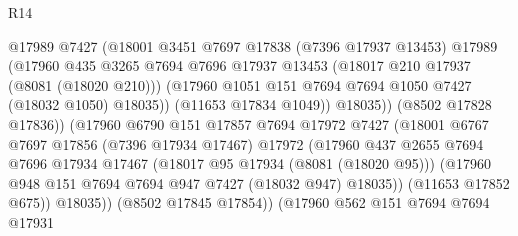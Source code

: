 \begin{lexlean}{R14}
\begin{coremodule}
                                  @17989
                                  @7427
                                  (@18001
                                    @3451
                                    @7697
                                    @17838
                                    (@7396 @17937 @13453)
                                    @17989
                                    (@17960
                                      @435
                                      @3265
                                      @7694
                                      @7696
                                      @17937
                                      @13453
                                      (@18017 @210 @17937 (@8081 (@18020 @210)))
                                      (@17960
                                        @1051
                                        @151
                                        @7694
                                        @7694
                                        @1050
                                        @7427
                                        (@18032 @1050)
                                        @18035))
                                    (@11653 @17834 @1049))
                                  @18035))
                              (@8502 @17828 @17836))
                            (@17960
                              @6790
                              @151
                              @17857
                              @7694
                              @17972
                              @7427
                              (@18001
                                @6767
                                @7697
                                @17856
                                (@7396 @17934 @17467)
                                @17972
                                (@17960
                                  @437
                                  @2655
                                  @7694
                                  @7696
                                  @17934
                                  @17467
                                  (@18017 @95 @17934 (@8081 (@18020 @95)))
                                  (@17960 @948 @151 @7694 @7694 @947 @7427 (@18032 @947) @18035))
                                (@11653 @17852 @675))
                              @18035))
                          (@8502 @17845 @17854))
                        (@17960
                          @562
                          @151
                          @7694
                          @7694
                          @17931

\end{coremodule}
\end{lexlean}
